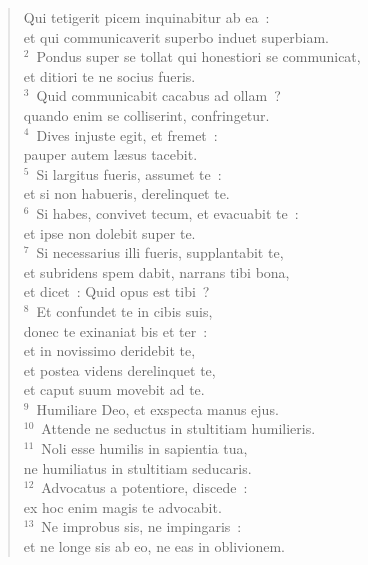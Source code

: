 \begin{flushleft}\begin{verse}\vspace{-19pt}\hspace{6pt}Qui tetigerit picem inquinabitur ab ea~:\\\hspace{6pt} et qui communicaverit superbo induet superbiam.\\
${}^{2}$~Pondus super se tollat qui honestiori se communicat,\\ et ditiori te ne socius fueris.\\
${}^{3}$~Quid communicabit cacabus ad ollam~?\\ quando enim se colliserint, confringetur.\\
${}^{4}$~Dives injuste egit, et fremet~:\\ pauper autem l\ae sus tacebit.\\
${}^{5}$~Si largitus fueris, assumet te~:\\ et si non habueris, derelinquet te.\\
${}^{6}$~Si habes, convivet tecum, et evacuabit te~:\\ et ipse non dolebit super te.\\
${}^{7}$~Si necessarius illi fueris, supplantabit te,\\ et subridens spem dabit, narrans tibi bona,\\ et dicet~: Quid opus est tibi~?\\
${}^{8}$~Et confundet te in cibis suis,\\ donec te exinaniat bis et ter~:\\ et in novissimo deridebit te,\\ et postea videns derelinquet te,\\ et caput suum movebit ad te.\\
${}^{9}$~Humiliare Deo, et exspecta manus ejus.\\
${}^{10}$~Attende ne seductus in stultitiam humilieris.\\
${}^{11}$~Noli esse humilis in sapientia tua,\\ ne humiliatus in stultitiam seducaris.\\
${}^{12}$~Advocatus a potentiore, discede~:\\ ex hoc enim magis te advocabit.\\
${}^{13}$~Ne improbus sis, ne impingaris~:\\ et ne longe sis ab eo, ne eas in oblivionem.\\

\end{verse}
\end{flushleft}
